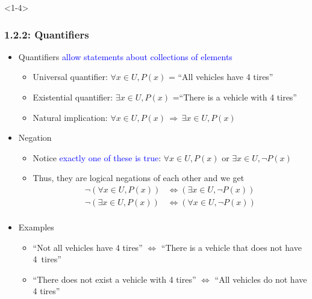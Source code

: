 \documentclass[10pt,english,aspectratio=169]{beamer}
\begin{document}
\begin{frame}<1-4> \frametitle{1.2.2: Quantifiers}

\begin{itemize}
\setlength\itemsep{2mm}
\item<1-> Quantifiers \textcolor{blue}{allow statements about collections of elements} \vspace{0.5mm}
\begin{itemize}
 \setlength\itemsep{1.5mm}
 \item Universal quantifier: $\forall x\!\in\! U, P(x)$ = ``All vehicles have 4 tires''
 \item Existential quantifier: $\exists x\!\in\! U, P(x)$ =``There is a vehicle with 4 tires''
 \item Natural implication: $\forall x \!\in\!U, P(x) \,\Rightarrow\, \exists x\!\in\! U, P(x)$ \vspace{0.5mm}
\end{itemize}

\item<2-> Negation \vspace{1mm}
\begin{itemize}
 \setlength\itemsep{1.5mm}
 \item Notice \textcolor{blue}{exactly one of these is true}: $\forall x\!\in\! U, P(x)$ or $\exists x\!\in\! U, \neg P(x)$
 \item<3-> Thus, they are logical negations of each other and we get \vspace{-1.5mm}
 \begin{align*}
   \neg \left(\forall x\!\in\! U, P(x) \right) &\Leftrightarrow \left( \exists x\!\in\! U, \neg P(x) \right) \\
   \neg \left(\exists x\!\in\! U, P(x) \right) &\Leftrightarrow \left( \forall x\!\in\! U, \neg P(x) \right) \\[-9mm]
 \end{align*}   
\end{itemize}

\item<4-> Examples \vspace{0.5mm}
\begin{itemize}
 \setlength\itemsep{1.5mm}
 \item ``Not all vehicles have 4 tires'' $\Leftrightarrow$ ``There is a vehicle that does not have 4~tires''$\!\!\!\!\!\!\!\!\!\!\!\!\!\!\!\!$
 \item ``There does not exist a vehicle with 4 tires'' $\Leftrightarrow$ ``All vehicles do not have 4 tires''\hspace*{-15mm}
  

\end{itemize}
\end{itemize}
\end{frame}
\end{document}
